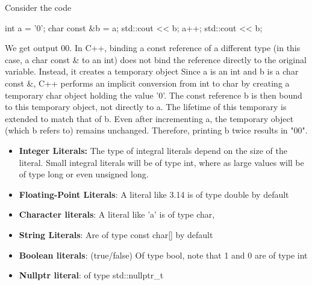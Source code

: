 \documentclass{report}
\begin{document}
\pagebreak 
{}
\bigbreak \noindent 
Consider the code
\bigbreak \noindent 
\begin{cppcode}
    int a = '0';
    char const &b = a;
    std::cout << b;
    a++;
    std::cout << b;
\end{cppcode}
\bigbreak \noindent 
We get output 00. In C++, binding a const reference of a different type (in this case, a char const & to an int) does not bind the reference directly to the original variable. Instead, it creates a temporary object
\bigbreak \noindent 
Since a is an int and b is a char const \&, C++ performs an implicit conversion from int to char by creating a temporary char object holding the value '0'. The const reference b is then bound to this temporary object, not directly to a. The lifetime of this temporary is extended to match that of b.
\bigbreak \noindent 
Even after incrementing a, the temporary object (which b refers to) remains unchanged. Therefore, printing b twice results in "00".

\pagebreak 
{}
\bigbreak \noindent 
\begin{itemize}
    \item \textbf{Integer Literals:} The type of integral literals depend on the size of the literal. Small integral literals will be of type int, where as large values will be of type long or even unsigned long.
    \item \textbf{Floating-Point Literals}: A literal like 3.14 is of type double by default
    \item \textbf{Character literals}: A literal like 'a' is of type char, 
    \item \textbf{String Literals}: Are of type const char[] by default
    \item \textbf{Boolean literals}: (true/false) Of type bool, note that 1 and 0 are of type int
    \item \textbf{Nullptr literal}: of type std::nullptr\_t
\end{itemize}
\end{document}
